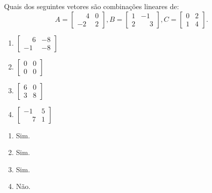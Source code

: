 \documentclass[12pt]{exam}
\begin{document}
\begin{exercicio}
    Quais dos seguintes vetores são combinações lineares de:
    \[
        A = \begin{bmatrix}
            \phantom{-} 4 & 0\\-2 & 2
        \end{bmatrix},
        B = \begin{bmatrix}
            1 & -1\\2 & \phantom{-} 3
        \end{bmatrix},
        C = \begin{bmatrix}
            0 & 2\\1 & 4
        \end{bmatrix}.
    \]
    \begin{multicols}{2}
        \begin{enumerate}[label={\alph*})]
            \item $\begin{bmatrix}
                \phantom{-} 6 & -8\\-1 & -8
            \end{bmatrix}$

            \item $\begin{bmatrix}
                0 & 0\\0 & 0
            \end{bmatrix}$

            \item $\begin{bmatrix}
                6 & 0\\3 & 8
            \end{bmatrix}$

            \item $\begin{bmatrix}
                -1 & 5\\\phantom{-} 7 & 1
            \end{bmatrix}$
        \end{enumerate}
    \end{multicols}
    \begin{solucao}
      \begin{multicols}{2}
        \begin{enumerate}[label={\alph*})]
          \item Sim.

          \item Sim.

          \item Sim.

          \item Não.
        \end{enumerate}
      \end{multicols}
    \end{solucao}
\end{exercicio}
\end{document}
